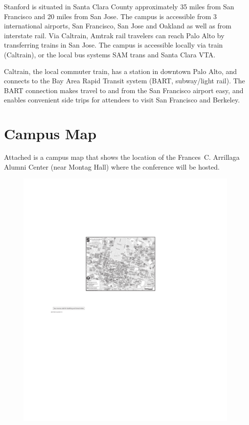 \documentclass[11pt]{article}
\begin{document}
Stanford is situated in Santa Clara County approximately 35 miles from
San Francisco and 20 miles from San Jose. The campus is accessible
from 3 international airports, San Francisco, San Jose and Oakland as
well as from interstate rail. Via Caltrain, Amtrak rail travelers can
reach Palo Alto by transferring trains in San Jose. The campus is
accessible locally via train (Caltrain), or the local bus systems SAM
trans and Santa Clara VTA.

Caltrain, the local commuter train, has a station in downtown Palo
Alto, and connects to the Bay Area Rapid Transit system (BART,
subway/light rail).  The BART connection makes travel to and from the
San Francisco airport easy, and enables convenient side trips for
attendees to visit San Francisco and Berkeley.

\section*{Campus Map}
\label{sec:campus-map}

Attached is a campus map that shows the location of the
Frances~C. Arrillaga Alumni Center (near Montag Hall) where the
conference will be hosted.

\begin{figure}
  \centering
  \includegraphics[width=0.98\textwidth]{fig/visitormap}
  \label{fig:campus-map}
\end{figure}
\end{document}
